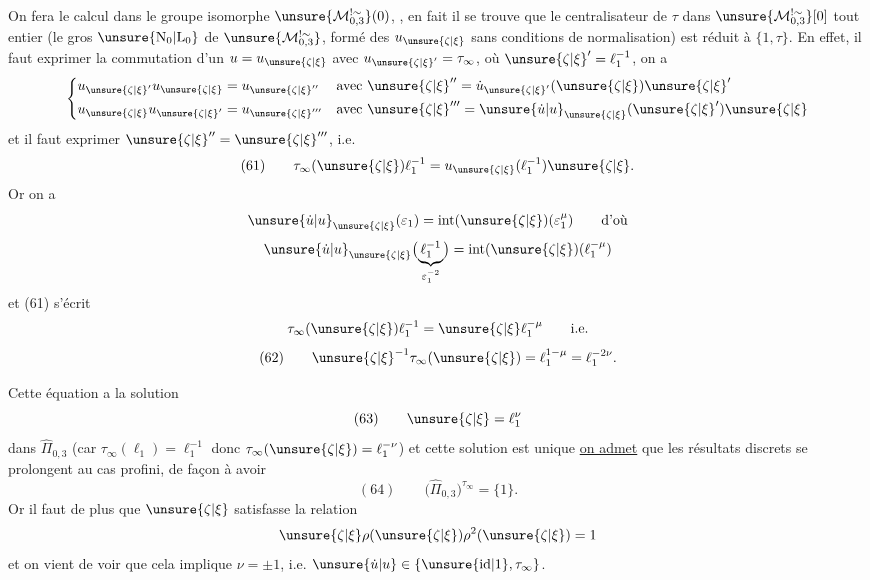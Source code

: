 On fera le calcul dans le groupe isomorphe
$\unsure{\mathcal M_{0,3}^{!\sim}}(0)$,
,
en fait il se trouve que le centralisateur de $\tau$ dans
$\unsure{\mathcal M_{0,3}^{!\sim}}[0]$ tout entier
(le gros  $\unsure{\mathrm N_0|\mathrm L_0}$ de
$\unsure{\mathcal M_{0,3}^{!\sim}}$, formé des
$u_{\unsure{\zeta|\xi}}$ sans conditions de normalisation)
est réduit à $\{1,\tau\}$.
En effet, il faut exprimer la commutation d'un
$u=u_{\unsure{\zeta|\xi}}$ avec
$u_{\unsure{\zeta|\xi}'}=\tau_\infty$,
où $\unsure{\zeta|\xi}'=\ell_1^{-1}$, on a
\[
\left\{\begin{aligned}
u_{\unsure{\zeta|\xi}'}u_{\unsure{\zeta|\xi}}
&=u_{\unsure{\zeta|\xi}''}
&&\text{avec }\unsure{\zeta|\xi}''=
\dot u_{\unsure{\zeta|\xi}'}(\unsure{\zeta|\xi})\unsure{\zeta|\xi}'
\\
u_{\unsure{\zeta|\xi}}u_{\unsure{\zeta|\xi}'}
&=u_{\unsure{\zeta|\xi}'''}
&&\text{avec }\unsure{\zeta|\xi}'''=
\unsure{\dot u|u}_{\unsure{\zeta|\xi}}(\unsure{\zeta|\xi}')\unsure{\zeta|\xi}
\end{aligned}\right.
\]
et il faut exprimer $\unsure{\zeta|\xi}''=\unsure{\zeta|\xi}'''$, i.e.
\[
(61)\qquad
\tau_\infty(\unsure{\zeta|\xi})\ell_1^{-1}
=u_{\unsure{\zeta|\xi}}(\ell_1^{-1})\unsure{\zeta|\xi}.
\]
Or on a
\[
\unsure{\dot u|u}_{\unsure{\zeta|\xi}}(\varepsilon_1)
=\mathrm{int}(\unsure{\zeta|\xi})(\varepsilon_1^\mu)
\qquad\text{d'où}
\]
\[
\unsure{\dot u|u}_{\unsure{\zeta|\xi}}
\bigl(\underbrace{\ell_1^{-1}}_{\varepsilon_1^{-2}}\bigr)
=\mathrm{int}(\unsure{\zeta|\xi})(\ell_1^{-\mu})
\]
et (61) s'écrit
\[
\tau_\infty(\unsure{\zeta|\xi})\ell_1^{-1}
=\unsure{\zeta|\xi}\ell_1^{-\mu}\qquad\text{i.e.}
\]
\[
(62)\qquad
\unsure{\zeta|\xi}^{-1}\tau_\infty(\unsure{\zeta|\xi})
=\ell_1^{1-\mu}=\ell_1^{-2\nu}.
\]


Cette équation a la solution
\[
(63)\qquad\unsure{\zeta|\xi}=\ell_1^\nu
\]
dans $\widehat\Pi_{0,3}$ (car $\tau_\infty(\ell_1)=\ell_1^{-1}$
donc $\tau_\infty(\unsure{\zeta|\xi})=\ell_1^{-\nu}$)
et cette solution est unique \uline{ on admet}
que les résultats discrets se prolongent au cas profini,
de façon à avoir
\[
(64)\qquad\bigl(\widehat\Pi_{0,3}\bigr)^{\tau_\infty}=\{1\}.
\]
Or il faut de plus que $\unsure{\zeta|\xi}$ satisfasse la relation
\[
\unsure{\zeta|\xi}\rho(\unsure{\zeta|\xi})
\rho^2(\unsure{\zeta|\xi})=1
\]
et on vient de voir que cela implique
$\nu=\pm1$, i.e.
$\unsure{\dot u|u}\in\{\unsure{\mathrm{id}|1},\tau_\infty\}$.

